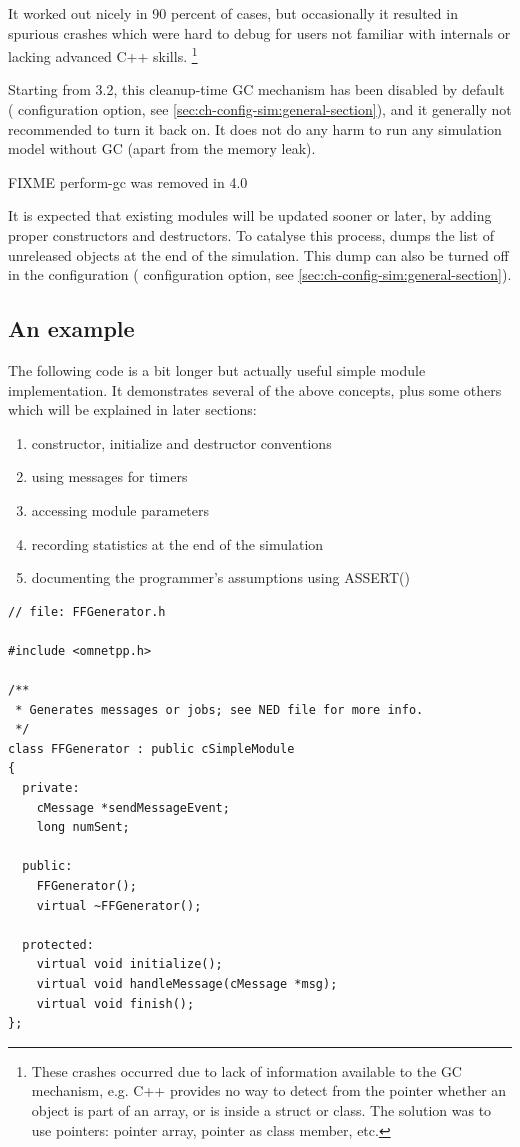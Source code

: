 It worked out nicely in 90 percent of cases, but occasionally it resulted
in spurious crashes which were hard to debug for users not familiar
with {\opp} internals or lacking advanced C++ skills.
    \footnote{These crashes occurred due to lack of information available
              to the GC mechanism, e.g. C++ provides no way to detect
              from the pointer whether an object is part of an array, or is
              inside a struct or class. The solution was to use pointers:
              pointer array, pointer as class member, etc.}

Starting from {\opp} 3.2, this cleanup-time GC mechanism has been disabled by default
( configuration option, see \ref{sec:ch-config-sim:general-section}),
and it generally not recommended to turn it back on. It does not do any harm
to run any simulation model without GC (apart from the memory leak).

FIXME perform-gc was removed in 4.0

It is expected that existing modules will be updated sooner or later, by adding
proper constructors and destructors. To catalyse this process, {\opp} dumps the
list of unreleased objects at the end of the simulation. This dump can also be
turned off in the configuration ( configuration option,
see \ref{sec:ch-config-sim:general-section}).



\subsection{An example}

The following code is a bit longer but actually useful simple module
implementation. It demonstrates several of the above concepts, plus
some others which will be explained in later sections:
\begin{enumerate}
  \item{constructor, initialize and destructor conventions}
  \item{using messages for timers}
  \item{accessing module parameters}
  \item{recording statistics at the end of the simulation}
  \item{documenting the programmer's assumptions using ASSERT()}
\end{enumerate}

\begin{verbatim}
// file: FFGenerator.h

#include <omnetpp.h>

/**
 * Generates messages or jobs; see NED file for more info.
 */
class FFGenerator : public cSimpleModule
{
  private:
    cMessage *sendMessageEvent;
    long numSent;

  public:
    FFGenerator();
    virtual ~FFGenerator();

  protected:
    virtual void initialize();
    virtual void handleMessage(cMessage *msg);
    virtual void finish();
};
\end{verbatim}

